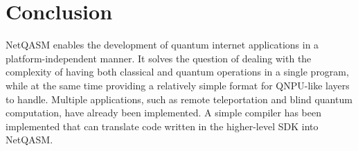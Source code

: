 \section{Conclusion}
\label{netqasm:sec:conclusion}
\ac{NetQASM} enables the development of quantum internet applications in a platform-independent manner.
It solves the question of dealing with the complexity of having both classical and quantum operations in a single program, while at the same time providing a relatively simple format for \ac{QNPU}-like layers to handle.
Multiple applications, such as remote teleportation and blind quantum computation, have already been implemented.
A simple compiler has been implemented that can translate code written in the higher-level SDK into \ac{NetQASM}.
